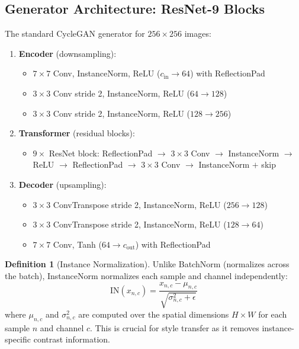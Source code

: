 \documentclass[11pt,a4paper]{article}
\theoremstyle{definition}
\newtheorem{definition}{Definition}[section]
\begin{document}
\subsection{Generator Architecture: ResNet-9 Blocks}

The standard CycleGAN generator for $256 \times 256$ images:

\begin{enumerate}
    \item \textbf{Encoder} (downsampling):
    \begin{itemize}
        \item $7 \times 7$ Conv, InstanceNorm, ReLU ($c_{\text{in}} \to 64$) with ReflectionPad
        \item $3 \times 3$ Conv stride 2, InstanceNorm, ReLU ($64 \to 128$)
        \item $3 \times 3$ Conv stride 2, InstanceNorm, ReLU ($128 \to 256$)
    \end{itemize}

    \item \textbf{Transformer} (residual blocks):
    \begin{itemize}
        \item $9 \times$ ResNet block: ReflectionPad $\to$ $3 \times 3$ Conv $\to$ InstanceNorm $\to$ ReLU $\to$ ReflectionPad $\to$ $3 \times 3$ Conv $\to$ InstanceNorm $+$ skip
    \end{itemize}

    \item \textbf{Decoder} (upsampling):
    \begin{itemize}
        \item $3 \times 3$ ConvTranspose stride 2, InstanceNorm, ReLU ($256 \to 128$)
        \item $3 \times 3$ ConvTranspose stride 2, InstanceNorm, ReLU ($128 \to 64$)
        \item $7 \times 7$ Conv, Tanh ($64 \to c_{\text{out}}$) with ReflectionPad
    \end{itemize}
\end{enumerate}

\begin{definition}[Instance Normalization]
Unlike BatchNorm (normalizes across the batch), InstanceNorm normalizes each sample and channel independently:
\begin{equation}
    \text{IN}(x_{n,c}) = \frac{x_{n,c} - \mu_{n,c}}{\sqrt{\sigma^2_{n,c} + \epsilon}}
\end{equation}
where $\mu_{n,c}$ and $\sigma^2_{n,c}$ are computed over the spatial dimensions $H \times W$ for each sample $n$ and channel $c$. This is crucial for style transfer as it removes instance-specific contrast information.
\end{definition}
\end{document}
